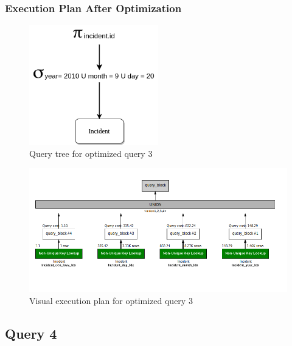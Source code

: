 \subsubsection{Execution Plan After Optimization}
\begin{figure}[H]
    \centering
    \includegraphics[width=0.5\textwidth]{images/query_trees/query3-optimized-and-non-optimized.png}
    \caption{Query tree for optimized query 3}
\end{figure}
\begin{figure}[H]
    \centering
    \includegraphics[width=\textwidth]{images/execution_plans/q3-3-new.png}
    \caption{Visual execution plan for optimized query 3}
\end{figure}

\subsection{Query 4}

